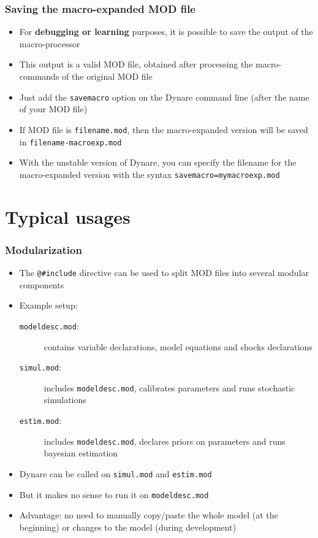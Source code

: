 \documentclass{beamer}
\begin{document}
\begin{frame}
  \frametitle{Saving the macro-expanded MOD file}
  \begin{itemize}
  \item For \textbf{debugging or learning} purposes, it is possible to save the output of the macro-processor
  \item This output is a valid MOD file, obtained after processing the macro-commands of the original MOD file
  \item Just add the \texttt{savemacro} option on the Dynare command line (after the name of your MOD file)
  \item If MOD file is \texttt{filename.mod}, then the macro-expanded version will be saved in \texttt{filename-macroexp.mod}
  \item With the unstable version of Dynare, you can specify the filename for the macro-expanded version with the syntax \texttt{savemacro=mymacroexp.mod}
  \end{itemize}
\end{frame}


\section{Typical usages}

\begin{frame}[fragile=singleslide]
  \frametitle{Modularization}
  \begin{itemize}
  \item The \verb+@#include+ directive can be used to split MOD files into several modular components
  \item Example setup:
    \begin{description}
    \item[\texttt{modeldesc.mod}:] contains variable declarations, model equations and shocks declarations
    \item[\texttt{simul.mod}:] includes \texttt{modeldesc.mod}, calibrates parameters and runs stochastic simulations
    \item[\texttt{estim.mod}:] includes \texttt{modeldesc.mod}, declares priors on parameters and runs bayesian estimation
    \end{description}
  \item Dynare can be called on \texttt{simul.mod} and \texttt{estim.mod}
  \item But it makes no sense to run it on \texttt{modeldesc.mod}
  \item Advantage: no need to manually copy/paste the whole model (at the beginning) or changes to the model (during development)
  \end{itemize}
\end{frame}
\end{document}
